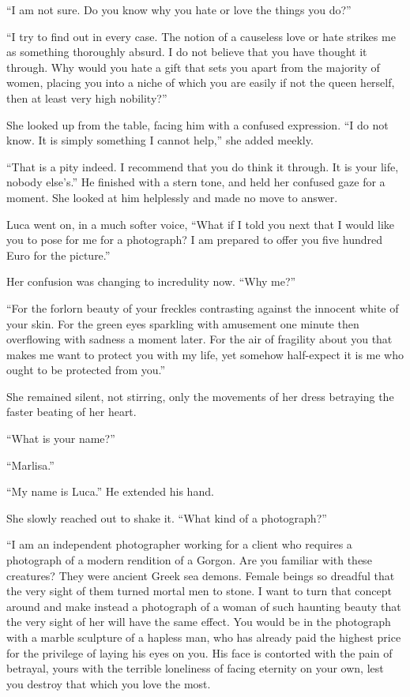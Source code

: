 ``I am not sure. Do you know why you hate or love the things you do?''

``I try to find out in every case. The notion of a causeless love or hate strikes me as something thoroughly absurd. I do not believe that you have thought it through. Why would you hate a gift that sets you apart from the majority of women, placing you into a niche of which you are easily if not the queen herself, then at least very high nobility?''

She looked up from the table, facing him with a confused expression. ``I do not know. It is simply something I cannot help,'' she added meekly.

``That is a pity indeed. I recommend that you do think it through. It is your life, nobody else's.'' He finished with a stern tone, and held her confused gaze for a moment. She looked at him helplessly and made no move to answer.

Luca went on, in a much softer voice, ``What if I told you next that I would like you to pose for me for a photograph? I am prepared to offer you five hundred Euro for the picture.''

Her confusion was changing to incredulity now. ``Why me?''

``For the forlorn beauty of your freckles contrasting against the innocent white of your skin. For the green eyes sparkling with amusement one minute then overflowing with sadness a moment later. For the air of fragility about you that makes me want to protect you with my life, yet somehow half-expect it is me who ought to be protected from you.''

She remained silent, not stirring, only the movements of her dress betraying the faster beating of her heart.

``What is your name?''

``Marlisa.''

``My name is Luca.'' He extended his hand.

She slowly reached out to shake it. ``What kind of a photograph?''

``I am an independent photographer working for a client who requires a photograph of a modern rendition of a Gorgon. Are you familiar with these creatures? They were ancient Greek sea demons. Female beings so dreadful that the very sight of them turned mortal men to stone. I want to turn that concept around and make instead a photograph of a woman of such haunting beauty that the very sight of her will have the same effect. You would be in the photograph with a marble sculpture of a hapless man, who has already paid the highest price for the privilege of laying his eyes on you. His face is contorted with the pain of betrayal, yours with the terrible loneliness of facing eternity on your own, lest you destroy that which you love the most.

